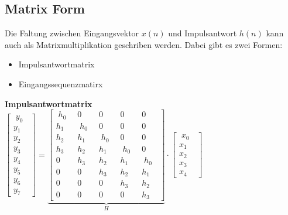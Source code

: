 	\subsection{Matrix Form}
		Die Faltung zwischen Eingangsvektor $x(n)$ und Impulsantwort $h(n)$ kann auch als Matrixmultiplikation geschriben werden. Dabei gibt es zwei Formen:
		\begin{itemize}
		 \item Impulsantwortmatrix$\qquad\quad\;$
		 \item Eingangssequenzmatirx $\qquad$\\
		\end{itemize}
		
		\begin{minipage}{0.5\textwidth}
			\textbf{Impulsantwortmatrix  }\\[0.2cm]
			$\begin{bmatrix} \;y_0\;\;\\y_1\\y_2\\y_3\\y_4\\y_5\\y_6\\y_7\end{bmatrix} = \underbrace{\begin{bmatrix} \;h_0\;\; & 0 & 0 & 0 & 0\\ h_1&\;h_0\;\;&0&0&0\\h_2&h_1&\;h_0\;\;&0&0\\h_3&h_2&h_1&\;h_0\;\;&0\\0&h_3&h_2&h_1&\;h_0\;\;\\0&0&h_3&h_2&h_1\\0&0&0&h_3&h_2\\0&0&0&0&h_3\end{bmatrix}}_{H}\cdot \begin{bmatrix} \;x_0\;\;\\x_1\\x_2\\x_3\\x_4\end{bmatrix}$
		\end{minipage}
